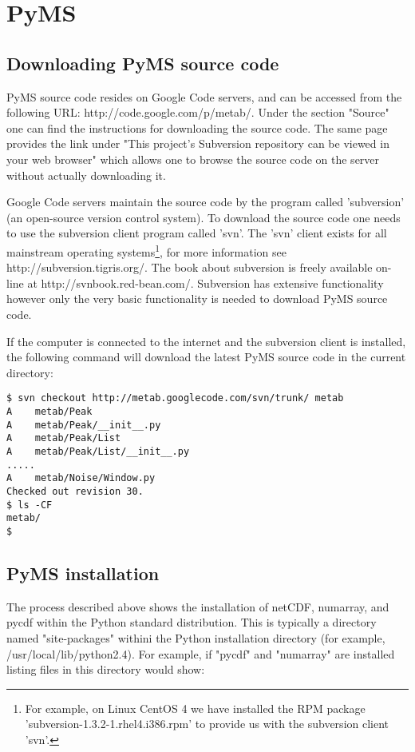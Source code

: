 \section{PyMS}

\subsection{Downloading PyMS source code}

PyMS source code resides on Google Code servers, and can be accessed
from the following URL: http://code.google.com/p/metab/. Under the
section "Source" one can find the instructions for downloading the
source code. The same page provides the link under "This project's
Subversion repository can be viewed in your web browser" which allows
one to browse the source code on the server without actually downloading
it.

Google Code servers maintain the source code by the program called
'subversion' (an open-source version control system).  To download the
source code one needs to use the subversion client program called 'svn'.
The 'svn' client exists for all mainstream operating systems\footnote{For
example, on Linux CentOS 4 we have installed the RPM package
'subversion-1.3.2-1.rhel4.i386.rpm' to provide us with the subversion
client 'svn'.}, for more information see http://subversion.tigris.org/.
The book about subversion is freely available on-line at
http://svnbook.red-bean.com/. Subversion has extensive functionality
however only the very basic functionality is needed to download PyMS
source code.

If the computer is connected to the internet and the subversion client
is installed, the following command will download the latest PyMS 
source code in the current directory:

\begin{verbatim}
$ svn checkout http://metab.googlecode.com/svn/trunk/ metab
A    metab/Peak
A    metab/Peak/__init__.py
A    metab/Peak/List
A    metab/Peak/List/__init__.py
.....
A    metab/Noise/Window.py
Checked out revision 30.
$ ls -CF
metab/
$
\end{verbatim}

\subsection{PyMS installation}

The process described above shows the installation of netCDF, numarray,
and pycdf within the Python standard distribution. This is typically
a directory named "site-packages" withini the Python installation
directory (for example, /usr/local/lib/python2.4). For example, if
"pycdf" and "numarray" are installed listing files in this directory
would show:

